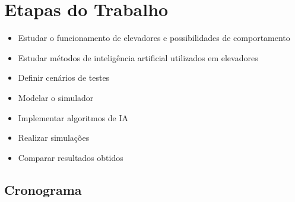 \chapter{\label{chap:stages}Etapas do Trabalho}

\begin{itemize}
    \item Estudar o funcionamento de elevadores e possibilidades de comportamento
    \item Estudar métodos de inteligência artificial utilizados em elevadores
    \item Definir cenários de testes
    \item Modelar o simulador
    \item Implementar algoritmos de IA
    \item Realizar simulações
    \item Comparar resultados obtidos
\end{itemize}

\section{Cronograma}